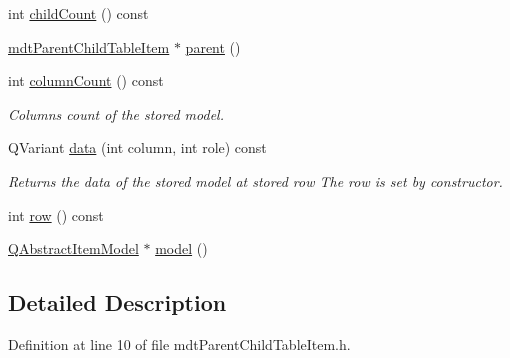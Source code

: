\begin{DoxyCompactItemize}
\item 
int \hyperlink{classmdt_parent_child_table_item_ac2168fc5f960d506f090b7aafcb4fec2}{child\-Count} () const 
\item 
\hyperlink{classmdt_parent_child_table_item}{mdt\-Parent\-Child\-Table\-Item} $\ast$ \hyperlink{classmdt_parent_child_table_item_ac4491aa3959249d1a1a6f1582b975589}{parent} ()
\item 
int \hyperlink{classmdt_parent_child_table_item_aca8d9e7b872c412d67f4125a88312c5a}{column\-Count} () const 
\begin{DoxyCompactList}\small\item\em Columns count of the stored model. \end{DoxyCompactList}\item 
Q\-Variant \hyperlink{classmdt_parent_child_table_item_a7150ac4c6a082887e7076f05a37f4781}{data} (int column, int role) const 
\begin{DoxyCompactList}\small\item\em Returns the data of the stored model at stored row The row is set by constructor. \end{DoxyCompactList}\item 
int \hyperlink{classmdt_parent_child_table_item_ab2defb25c5033398a6fc4fcd7f015c95}{row} () const 
\item 
\hyperlink{class_q_abstract_item_model}{Q\-Abstract\-Item\-Model} $\ast$ \hyperlink{classmdt_parent_child_table_item_aceb2319dfd2707cfe8d93705f56bc43c}{model} ()
\end{DoxyCompactItemize}


\subsection{Detailed Description}


Definition at line 10 of file mdt\-Parent\-Child\-Table\-Item.\-h.



